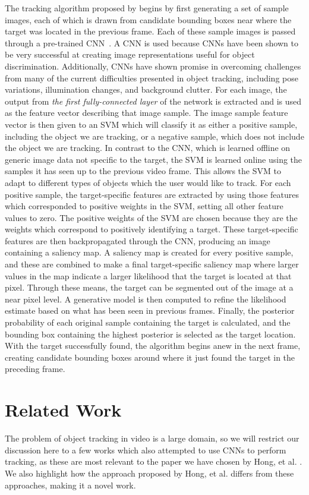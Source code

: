 \documentclass{sig-alternate-05-2015}
\begin{document}
The tracking algorithm proposed by \cite{hong2015online} begins by first generating a set of sample images, each of which is drawn from candidate bounding boxes near where the target was located in the previous frame.
Each of these sample images is passed through a pre-trained CNN~\cite{jia2014caffe}.
A CNN is used because CNNs have been shown to be very successful at creating image representations useful for object discrimination.
Additionally, CNNs have shown promise in overcoming challenges from many of the current difficulties presented in object tracking, including pose variations, illumination changes, and background clutter.
For each image, the output from \textit{the first fully-connected layer} of the network is extracted and is used as the feature vector describing that image sample.
The image sample feature vector is then given to an SVM which will classify it as either a positive sample, including the object we are tracking, or a negative sample, which does not include the object we are tracking.
In contrast to the CNN, which is learned offline on generic image data not specific to the target, the SVM is learned online using the samples it has seen up to the previous video frame.
This allows the SVM to adapt to different types of objects which the user would like to track.
For each positive sample, the target-specific features are extracted by using those features which corresponded to positive weights in the SVM, setting all other feature values to zero.
The positive weights of the SVM are chosen because they are the weights which correspond to positively identifying a target.
These target-specific features are then backpropagated through the CNN, producing an image containing a saliency map.
A saliency map is created for every positive sample, and these are combined to make a final target-specific saliency map where larger values in the map indicate a larger likelihood that the target is located at that pixel.
Through these means, the target can be segmented out of the image at a near pixel level.
A generative model is then computed to refine the likelihood estimate based on what has been seen in previous frames.
Finally, the posterior probability of each original sample containing the target is calculated, and the bounding box containing the highest posterior is selected as the target location.
With the target successfully found, the algorithm begins anew in the next frame, creating candidate bounding boxes around where it just found the target in the preceding frame.

\section{Related Work}
The problem of object tracking in video is a large domain, so we will restrict our discussion here to a few works which also attempted to use CNNs to perform tracking, as these are most relevant to the paper we have chosen by Hong, et al. \cite{hong2015online}.
We also highlight how the approach proposed by Hong, et al. differs from these approaches, making it a novel work.
\end{document}
